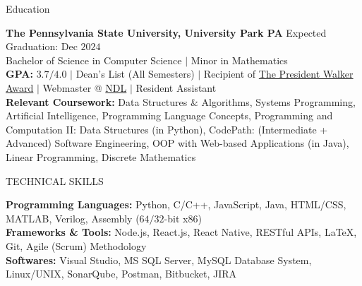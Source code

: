 \documentclass{resume} %
\begin{document}

\begin{rSection}{Education}

{\bf The Pennsylvania State University, University Park PA} \hfill {Expected Graduation: Dec $2024$}\\
{Bachelor of Science in Computer Science $\vert$ Minor in Mathematics}\\
{\bf GPA:} $3.7/4.0$ $\vert$ Dean's List (All Semesters) $\vert$ Recipient of \href{https://awardsrecognition.psu.edu/student/undergraduate-scholastic-awards/}{The President Walker Award} $\vert$ Webmaster @ \href{https://ndl.psu.edu/}{NDL} $\vert$ Resident Assistant\\
{\bf Relevant Coursework:} Data Structures \& Algorithms, Systems Programming, Artificial Intelligence, Programming Language Concepts, Programming and Computation II: Data Structures (in Python), CodePath: (Intermediate + Advanced) Software Engineering, OOP with Web-based Applications (in Java), Linear Programming, Discrete Mathematics
\end{rSection}


\begin{rSection}{TECHNICAL SKILLS}

{\bf Programming Languages:} Python, C/C++, JavaScript, Java, HTML/CSS, MATLAB, Verilog, Assembly ($64/32$-bit x$86$)\\
{\bf Frameworks \& Tools:} Node.js, React.js, React Native, RESTful APIs, \LaTeX, Git, Agile (Scrum) Methodology\\
{\bf Softwares:} Visual Studio, MS SQL Server, MySQL Database System, Linux/UNIX, SonarQube, Postman, Bitbucket, JIRA

\end{rSection}
\end{document}
